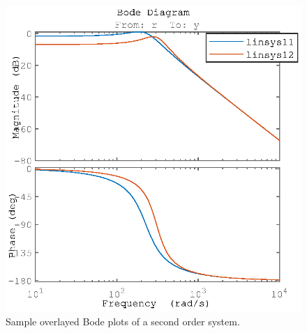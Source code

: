 %
\begin{figure}
  \centering
  \includegraphics{images/Lab_2_Bode_ClosedLoop.eps}%
  \caption[Sample Overlayed Bode Plots of a Second Order System]{
    Sample overlayed Bode plots of a second order system.
  }
  \label{fig:lab2:bodeclosed}
\end{figure}
%

